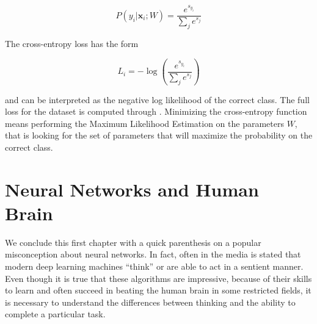 \documentclass[12pt,a4paper]{report}
\theoremstyle{definition}
\begin{document}
\begin{equation}
   P \left(y_i |\textbf{x}_i; W \right) = \frac{e^{s_{y_{i}}}}{\sum_j e^{s_j}}
   \label{eq:softmax_func}
\end{equation}

The cross-entropy loss has the form

\begin{equation}
     L_i = -\log \left( \frac{e^{s_{y_{i}}}}{\sum_j e^{s_j}} \right)
\end{equation}

and can be interpreted as the negative log likelihood of the correct class. The full loss for the dataset is computed through . Minimizing the cross-entropy function means performing the Maximum Likelihood Estimation on the parameters $W$, that is looking for the set of parameters that will maximize the probability on the correct class. 

\section{Neural Networks and Human Brain}
\label{sec:NN_thinking}

We conclude this first chapter with a quick parenthesis on a popular misconception about neural networks.
In fact, often in the media is stated that modern deep learning machines ``think'' or are able to act in a sentient manner. 
Even though it is true that these algorithms are impressive, because of their skills to learn and often succeed in beating the human brain in some restricted fields, it is necessary to understand the differences between thinking and the ability to complete a particular task.
\end{document}
